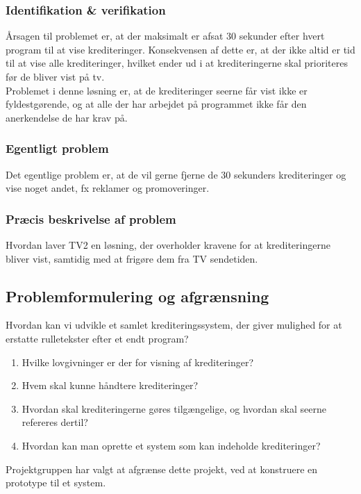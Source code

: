 \subsubsection{Identifikation \& verifikation}
Årsagen til problemet er, at der maksimalt er afsat 30 sekunder efter hvert program til at vise krediteringer. Konsekvensen af dette er, at der ikke altid er tid til at vise alle krediteringer, hvilket ender ud i at krediteringerne skal prioriteres før de bliver vist på tv.\\

\noindent
Problemet i denne løsning er, at de krediteringer seerne får vist ikke er fyldestgørende, og at alle der har arbejdet på programmet ikke får den anerkendelse de har krav på.

\subsubsection{Egentligt problem}
Det egentlige problem er, at de vil gerne fjerne de 30 sekunders krediteringer og vise noget andet, fx reklamer og promoveringer.

\subsubsection{Præcis beskrivelse af problem}
Hvordan laver TV2 en løsning, der overholder kravene for at  krediteringerne bliver vist, samtidig med at frigøre dem fra TV sendetiden.

\subsection{Problemformulering og afgrænsning}
Hvordan kan vi udvikle et samlet krediteringssystem, der giver mulighed for at erstatte rulletekster efter et endt program?

\begin{enumerate}
    \item Hvilke lovgivninger er der for visning af krediteringer?
    \item Hvem skal kunne håndtere krediteringer?
    \item Hvordan skal krediteringerne gøres tilgængelige, og hvordan skal seerne refereres dertil?
    \item Hvordan kan man oprette et system som kan indeholde krediteringer?
\end{enumerate}

\noindent
Projektgruppen har valgt at afgrænse dette projekt, ved at konstruere en prototype til et system.
